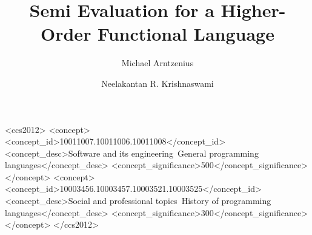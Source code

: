 \documentclass[acmsmall,review,anonymous,]{acmart}\settopmatter{printfolios=true,printccs=false,printacmref=false}
\begin{document}
\title{Semi\naive{} Evaluation for a Higher-Order Functional Language}


\author{Michael Arntzenius}

\author{Neelakantan R. Krishnaswami}


\begin{abstract}
\end{abstract}


\begin{CCSXML}
<ccs2012>
<concept>
<concept_id>10011007.10011006.10011008</concept_id>
<concept_desc>Software and its engineering~General programming languages</concept_desc>
<concept_significance>500</concept_significance>
</concept>
<concept>
<concept_id>10003456.10003457.10003521.10003525</concept_id>
<concept_desc>Social and professional topics~History of programming languages</concept_desc>
<concept_significance>300</concept_significance>
</concept>
</ccs2012>
\end{CCSXML}
\end{document}
